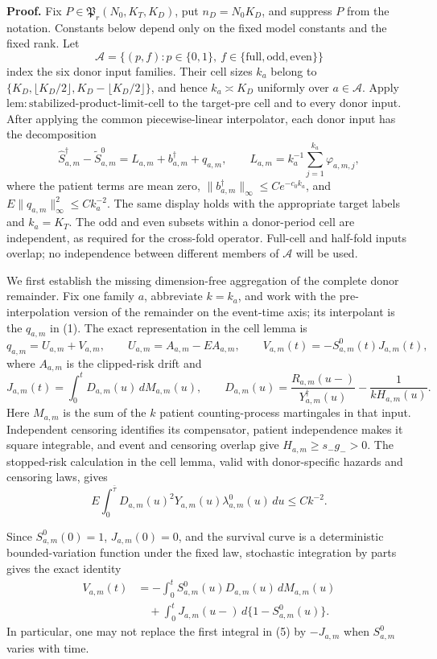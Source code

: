 \textbf{Proof.}
Fix \(P\in\mathfrak P_r(N_0,K_T,K_D)\), put
\(n_D=N_0K_D\), and suppress \(P\) from the notation.  Constants below
depend only on the fixed model constants and the fixed rank.  Let
\[
 \mathscr A=\{(p,f):p\in\{0,1\},\
 f\in\{\mathrm{full},\mathrm{odd},\mathrm{even}\}\}
\]
index the six donor input families.  Their cell sizes \(k_a\) belong to
\(\{K_D,\lfloor K_D/2\rfloor,K_D-\lfloor K_D/2\rfloor\}\), and hence
\(k_a\asymp K_D\) uniformly over \(a\in\mathscr A\).  Apply
\(\mathrm{lem:stabilized\mbox{-}product\mbox{-}limit\mbox{-}cell}\) to
the target-pre cell and to every donor input.  After applying the common
piecewise-linear interpolator, each donor input has the decomposition
\[
 \widehat S_{a,m}^{\dagger}-\widetilde S^0_{a,m}
 =L_{a,m}+b_{a,m}^{\dagger}+q_{a,m},
 \qquad
 L_{a,m}=k_a^{-1}\sum_{j=1}^{k_a}\varphi_{a,m,j},       \tag{1}
\]
where the patient terms are mean zero,
\(\|b_{a,m}^{\dagger}\|_\infty\leq Ce^{-c_0k_a}\), and
\(E\|q_{a,m}\|_\infty^2\leq Ck_a^{-2}\).  The same display holds with
the appropriate target labels and \(k_a=K_T\).  The odd and even subsets
within a donor-period cell are independent, as required for the cross-fold
operator.  Full-cell and half-fold inputs overlap; no independence between
different members of \(\mathscr A\) will be used.

We first establish the missing dimension-free aggregation of the complete
donor remainder.  Fix one family \(a\), abbreviate \(k=k_a\), and work with
the pre-interpolation version of the remainder on the event-time axis; its
interpolant is the \(q_{a,m}\) in (1).  The exact representation in the cell
lemma is
\[
 q_{a,m}=U_{a,m}+V_{a,m},
 \qquad
 U_{a,m}=A_{a,m}-EA_{a,m},
 \qquad
 V_{a,m}(t)=-S^0_{a,m}(t)J_{a,m}(t),                   \tag{2}
\]
where \(A_{a,m}\) is the clipped-risk drift and
\[
 J_{a,m}(t)=\int_0^tD_{a,m}(u)\,dM_{a,m}(u),
 \qquad
 D_{a,m}(u)=\frac{R_{a,m}(u-)}{Y_{a,m}^{\dagger}(u)}
             -\frac{1}{kH_{a,m}(u)}.                  \tag{3}
\]
Here \(M_{a,m}\) is the sum of the \(k\) patient counting-process
martingales in that input.  Independent censoring identifies its compensator,
patient independence makes it square integrable, and event and censoring
overlap give \(H_{a,m}\geq s_-g_->0\).  The stopped-risk calculation in
the cell lemma, valid with donor-specific hazards and censoring laws, gives
\[
 E\int_0^{\bar\tau}D_{a,m}(u)^2Y_{a,m}(u)
       \lambda^0_{a,m}(u)\,du\leq Ck^{-2}.             \tag{4}
\]

Since \(S^0_{a,m}(0)=1\), \(J_{a,m}(0)=0\), and the survival curve is a
deterministic bounded-variation function under the fixed law, stochastic
integration by parts gives the exact identity
\[
 \begin{split}
 V_{a,m}(t)
 &=-\int_0^tS^0_{a,m}(u)D_{a,m}(u)\,dM_{a,m}(u)\\
 &\quad+\int_0^tJ_{a,m}(u-)\,d\{1-S^0_{a,m}(u)\}.
 \end{split}                                           \tag{5}
\]
In particular, one may not replace the first integral in (5) by
\(-J_{a,m}\) when \(S^0_{a,m}\) varies with time.


